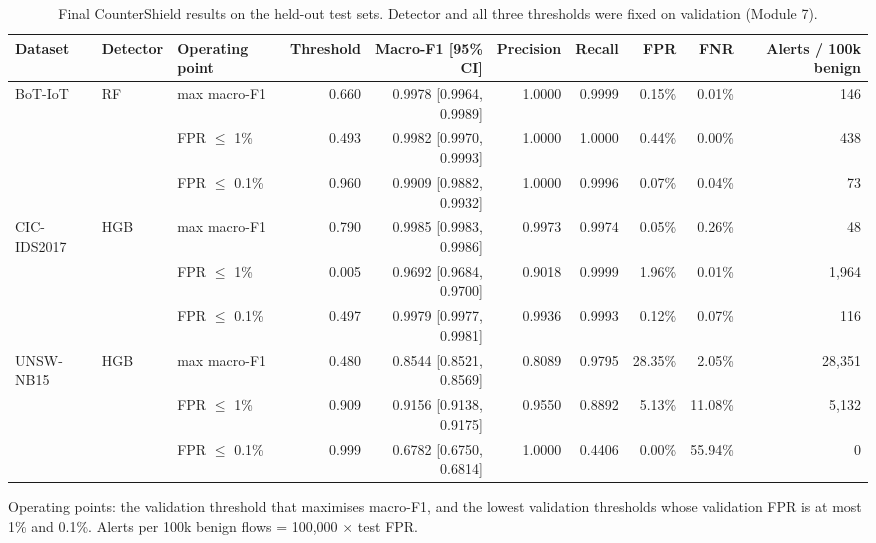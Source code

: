 \begin{table}[t]
\centering
\caption{Final CounterShield results on the held-out test sets. Detector and all three thresholds were fixed on validation (Module 7).}
\label{tab:countershield}
\footnotesize
\setlength{\tabcolsep}{3.5pt}
\begin{adjustbox}{max width=\linewidth}
\begin{tabular}{lllrrrrrrr}
\toprule
Dataset & Detector & Operating point & Threshold & Macro-F1 [95\% CI] & Precision & Recall & FPR & FNR & Alerts / 100k benign \\
\midrule
BoT-IoT & RF & max macro-F1 & 0.660 & 0.9978 [0.9964, 0.9989] & 1.0000 & 0.9999 & 0.15\% & 0.01\% & 146 \\
 &  & FPR $\le$ 1\% & 0.493 & 0.9982 [0.9970, 0.9993] & 1.0000 & 1.0000 & 0.44\% & 0.00\% & 438 \\
 &  & FPR $\le$ 0.1\% & 0.960 & 0.9909 [0.9882, 0.9932] & 1.0000 & 0.9996 & 0.07\% & 0.04\% & 73 \\
\midrule
CIC-IDS2017 & HGB & max macro-F1 & 0.790 & 0.9985 [0.9983, 0.9986] & 0.9973 & 0.9974 & 0.05\% & 0.26\% & 48 \\
 &  & FPR $\le$ 1\% & 0.005 & 0.9692 [0.9684, 0.9700] & 0.9018 & 0.9999 & 1.96\% & 0.01\% & 1,964 \\
 &  & FPR $\le$ 0.1\% & 0.497 & 0.9979 [0.9977, 0.9981] & 0.9936 & 0.9993 & 0.12\% & 0.07\% & 116 \\
\midrule
UNSW-NB15 & HGB & max macro-F1 & 0.480 & 0.8544 [0.8521, 0.8569] & 0.8089 & 0.9795 & 28.35\% & 2.05\% & 28,351 \\
 &  & FPR $\le$ 1\% & 0.909 & 0.9156 [0.9138, 0.9175] & 0.9550 & 0.8892 & 5.13\% & 11.08\% & 5,132 \\
 &  & FPR $\le$ 0.1\% & 0.999 & 0.6782 [0.6750, 0.6814] & 1.0000 & 0.4406 & 0.00\% & 55.94\% & 0 \\
\bottomrule
\end{tabular}
\end{adjustbox}
\par\vspace{2pt}
\parbox{0.95\linewidth}{\scriptsize Operating points: the validation threshold that maximises macro-F1, and the lowest validation thresholds whose validation FPR is at most 1\% and 0.1\%. Alerts per 100k benign flows = 100,000 $\times$ test FPR.}
\end{table}
